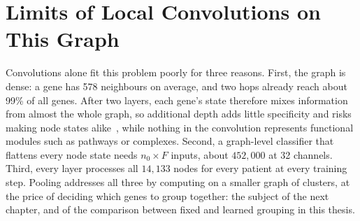 \section{Limits of Local Convolutions on This Graph}
\label{sec:limits}

Convolutions alone fit this problem poorly for three reasons. First, the graph is dense: a gene
has 578 neighbours on average, and two hops already reach about 99\% of all genes. After two
layers, each gene's state therefore mixes information from almost the whole graph, so additional
depth adds little specificity and risks making node states alike~\cite{li2018deeper}, while nothing
in the convolution represents functional modules such as pathways or complexes. Second, a
graph-level classifier that flattens every node state needs $n_0 \times F$ inputs, about $452{,}000$
at 32 channels. Third, every layer processes all $14{,}133$ nodes for every patient at every
training step. Pooling addresses all three by computing on a smaller graph of clusters, at the price
of deciding which genes to group together: the subject of the next chapter, and of the comparison
between fixed and learned grouping in this thesis.
